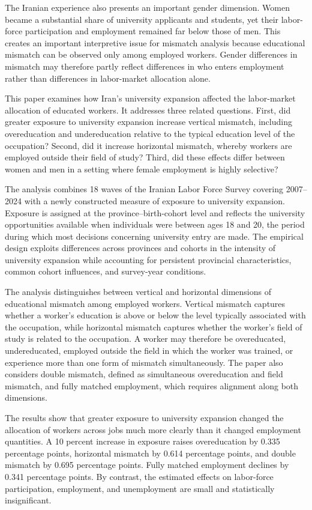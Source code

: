 The Iranian experience also presents an important gender dimension. Women became a substantial share of university applicants and students, yet their labor-force participation and employment remained far below those of men. This creates an important interpretive issue for mismatch analysis because educational mismatch can be observed only among employed workers. Gender differences in mismatch may therefore partly reflect differences in who enters employment rather than differences in labor-market allocation alone.

This paper examines how Iran's university expansion affected the labor-market allocation of educated workers. It addresses three related questions. First, did greater exposure to university expansion increase vertical mismatch, including overeducation and undereducation relative to the typical education level of the occupation? Second, did it increase horizontal mismatch, whereby workers are employed outside their field of study? Third, did these effects differ between women and men in a setting where female employment is highly selective?

The analysis combines 18 waves of the Iranian Labor Force Survey covering 2007--2024 with a newly constructed measure of exposure to university expansion. Exposure is assigned at the province--birth-cohort level and reflects the university opportunities available when individuals were between ages 18 and 20, the period during which most decisions concerning university entry are made. The empirical design exploits differences across provinces and cohorts in the intensity of university expansion while accounting for persistent provincial characteristics, common cohort influences, and survey-year conditions.

The analysis distinguishes between vertical and horizontal dimensions of educational mismatch among employed workers. Vertical mismatch captures whether a worker's education is above or below the level typically associated with the occupation, while horizontal mismatch captures whether the worker's field of study is related to the occupation. A worker may therefore be overeducated, undereducated, employed outside the field in which the worker was trained, or experience more than one form of mismatch simultaneously. The paper also considers double mismatch, defined as simultaneous overeducation and field mismatch, and fully matched employment, which requires alignment along both dimensions.

The results show that greater exposure to university expansion changed the allocation of workers across jobs much more clearly than it changed employment quantities. A 10 percent increase in exposure raises overeducation by 0.335 percentage points, horizontal mismatch by 0.614 percentage points, and double mismatch by 0.695 percentage points. Fully matched employment declines by 0.341 percentage points. By contrast, the estimated effects on labor-force participation, employment, and unemployment are small and statistically insignificant.

